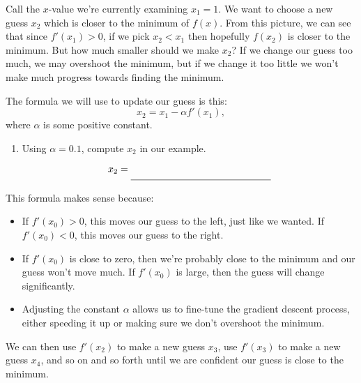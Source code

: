 \documentclass[11pt]{article}
\begin{document}
Call the $x$-value we're currently examining $x_1=1$. We want to choose a new guess $x_2$ which is closer to the minimum of $f(x)$.
From this picture, we can see that since $f'(x_1)>0$, if we pick $x_2 < x_1$ then hopefully  $f(x_2)$ is closer to the minimum. But how much smaller should we make $x_2$? If we change our guess too much, we may overshoot the minimum, but if we change it too little we won't make much progress towards finding the minimum. 

The formula we will use to update our guess is this:
\[
    x_2 = x_1 - \alpha f'(x_1),
\]
where $\alpha$ is some positive constant.
\begin{enumerate}
    \item[2.]  Using $\alpha = 0.1$, compute $x_2$ in our example.
    \[
        x_2 = \unlineb{2}{}
    \]
\end{enumerate}
\newpage
This formula makes sense because:
\begin{itemize}
    \item If $f'(x_0)>0$, this moves our guess to the left, just like we wanted. If $f'(x_0) < 0$, this moves our guess to the right.
    \item If $f'(x_0)$ is close to zero, then we're probably close to the minimum and our guess won't move much. If $f'(x_0)$ is large, then the guess will change significantly.
    \item Adjusting the constant $\alpha$ allows us to fine-tune the gradient descent process, either speeding it up or making sure we don't overshoot the minimum.
\end{itemize}
We can then use $f'(x_2)$ to make a new guess $x_3$, use $f'(x_3)$ to make a new guess $x_4$, and so on and so forth until we are confident our guess is close to the minimum.
\end{document}
